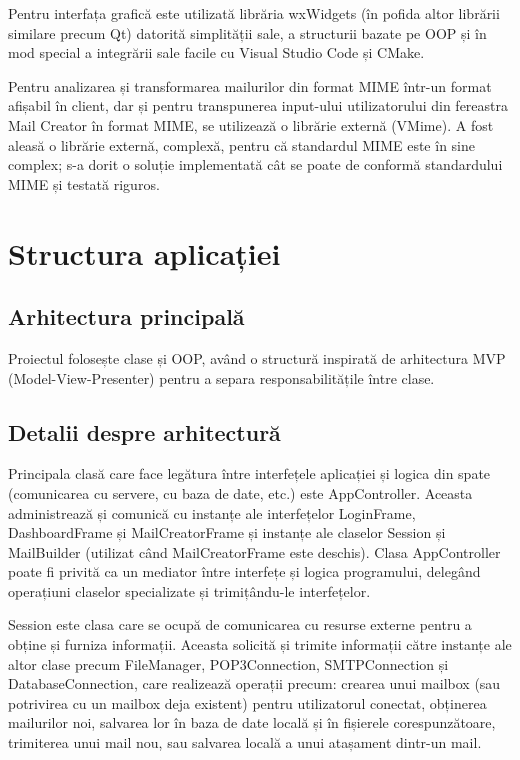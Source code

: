 \documentclass[runningheads]{llncs}
\begin{document}
Pentru interfața grafică este utilizată librăria wxWidgets (în pofida altor librării similare precum Qt) datorită simplității sale, a structurii bazate pe OOP și în mod special a integrării sale facile cu Visual Studio Code și CMake.

Pentru analizarea și transformarea mailurilor din format MIME\cite{ref_rfc_mime} într-un format afișabil în client, dar și pentru transpunerea input-ului utilizatorului din fereastra Mail Creator în format MIME, se utilizează o librărie externă (VMime). A fost aleasă o librărie externă, complexă, pentru că standardul MIME este în sine complex; s-a dorit o soluție implementată cât se poate de conformă standardului MIME și testată riguros.



\section{Structura aplicației}


\subsection{Arhitectura principală}

Proiectul folosește clase și OOP, având o structură inspirată de arhitectura MVP (Model-View-Presenter) pentru a separa responsabilitățile între clase.



\subsection{Detalii despre arhitectură}


Principala clasă care face legătura între interfețele aplicației și logica din spate (comunicarea cu servere, cu baza de date, etc.) este AppController. Aceasta administrează și comunică cu instanțe ale interfețelor LoginFrame, DashboardFrame și MailCreatorFrame și instanțe ale claselor Session și MailBuilder (utilizat când MailCreatorFrame este deschis). Clasa AppController poate fi privită ca un mediator între interfețe și logica programului, delegând operațiuni claselor specializate și trimițându-le interfețelor.

Session este clasa care se ocupă de comunicarea cu resurse externe pentru a obține și furniza informații. Aceasta solicită și trimite informații către instanțe ale altor clase precum FileManager, POP3Connection, SMTPConnection și DatabaseConnection, care realizează operații precum: crearea unui mailbox (sau potrivirea cu un mailbox deja existent) pentru utilizatorul conectat, obținerea mailurilor noi, salvarea lor în baza de date locală și în fișierele corespunzătoare, trimiterea unui mail nou, sau salvarea locală a unui atașament dintr-un mail.
\end{document}
